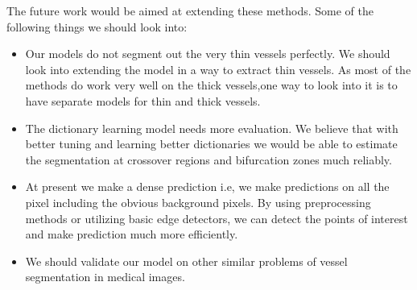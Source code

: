 The future work would be aimed at extending these methods. Some of the following things we should look into:
\begin{itemize}
	\item Our models do not segment out the very thin vessels perfectly. We should look into extending the model in a way to extract thin vessels. As most of the methods do work very well on the thick vessels,one way to look into it is to have separate models for thin and thick vessels.
	\item The dictionary learning model needs more evaluation. We believe that with better tuning and learning better dictionaries we would be able to estimate the segmentation at crossover regions and bifurcation zones much reliably.
	\item At present we make a dense prediction i.e, we make predictions on all the pixel including the obvious background pixels. By using preprocessing methods or utilizing basic edge detectors, we can detect the points of interest and make prediction much more efficiently.
	\item We should validate our model on other similar problems of vessel segmentation in medical images. 
\end{itemize}




